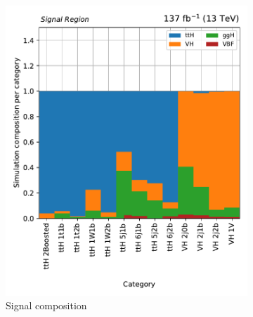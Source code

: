 \begin{figure}[htbp]
    \centering
    \begin{subfigure}[b]{0.49\textwidth}
        \includegraphics[width=\textwidth]{figures/region_plots/full_Run2/region_0/signal_composition.pdf}
        \caption{Signal composition}
    \end{subfigure}
    \hfill
    \begin{subfigure}[b]{0.49\textwidth}

\end{subfigure}
\end{figure}
